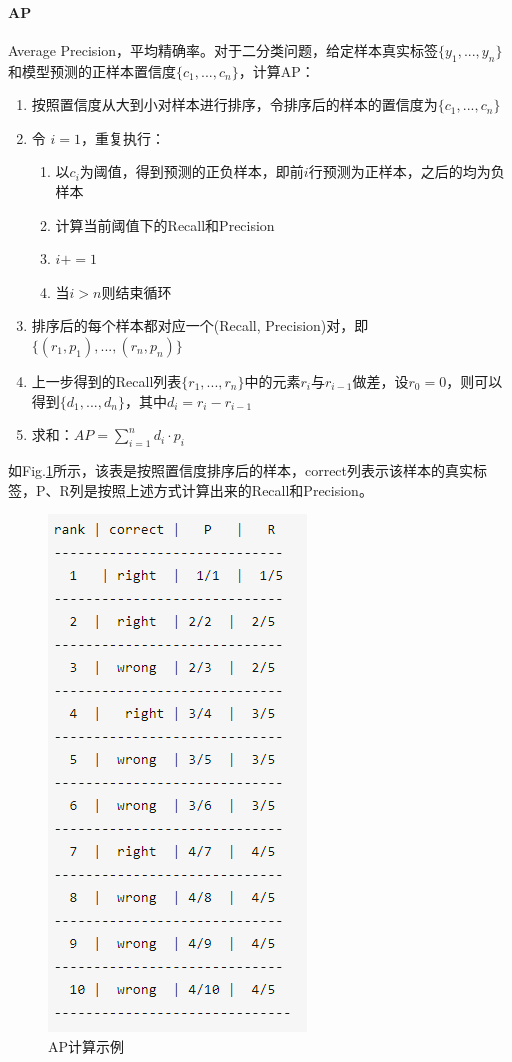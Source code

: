 \paragraph{AP}
Average Precision，平均精确率。对于二分类问题，给定样本真实标签$\{y_1, ..., y_n\}$和模型预测的正样本置信度$\{c_1, ..., c_n\}$，计算AP：
\begin{enumerate}
	\item 按照置信度从大到小对样本进行排序，令排序后的样本的置信度为$\{c_1, ..., c_n\}$
	\item 令 $i=1$，重复执行：
	\begin{enumerate}
		\item 以$c_i$为阈值，得到预测的正负样本，即前$i$行预测为正样本，之后的均为负样本
		\item 计算当前阈值下的Recall和Precision
		\item $i += 1$
		\item 当$i > n$则结束循环
	\end{enumerate}
	\item 排序后的每个样本都对应一个(Recall, Precision)对，即$\{(r_1, p_1), ..., (r_n, p_n)\}$
	\item 上一步得到的Recall列表$\{r_1, ..., r_n\}$中的元素$r_i$与$r_{i-1}$做差，设$r_0 = 0$，则可以得到$\{d_1, ..., d_n\}$，其中$d_i = r_i - r_{i-1}$
	\item 求和：$AP = \sum_{i=1}^n d_i \cdot p_i$
\end{enumerate}
如Fig.\ref{fig:ap}所示，该表是按照置信度排序后的样本，correct列表示该样本的真实标签，P、R列是按照上述方式计算出来的Recall和Precision。
\begin{figure}[h]
	\centering
	\includegraphics[width=.3\textwidth]{pics/AP.png}
	\caption{AP计算示例}
	\label{fig:ap}
\end{figure}

